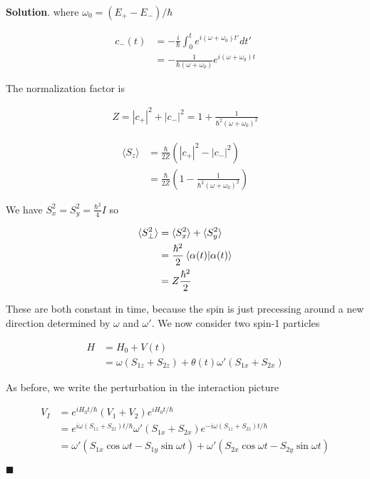 \documentclass[12pt]{article}
\theoremstyle{definition}
\newenvironment{s}{%
        \begin{trivlist} \item \textbf{Solution}. }{%
            \hspace*{\fill} $\blacksquare$\end{trivlist}}%
\begin{document}
{\begin{s}
where $\omega_{0} = (E_{+}-E_{-})/\hbar$

\begin{align*}
c_{-}(t) &= -\frac{i}{\hbar}\int_{0}^{t}e^{i(\omega+\omega_{0})t'}dt'\\
&= -\frac{1}{\hbar(\omega+\omega_{0})}e^{i(\omega+\omega_{0})t}
\end{align*}

The normalization factor is

\begin{align*}
Z = |c_{+}|^{2} + |c_{-}|^{2} = 1 + \frac{1}{\hbar^{2}(\omega+\omega_{0})^{2}}
\end{align*}

\begin{align*}
\langle S_{z}\rangle &= \frac{\hbar}{2Z}\left(|c_{+}|^{2} - |c_{-}|^{2}\right)\\
&= \frac{\hbar}{2Z}\left(1 - \frac{1}{\hbar^{2}(\omega+\omega_{0})^{2}}\right)
\end{align*}

We have $S_{x}^{2} = S_{y}^{2} = \frac{\hbar^{2}}{4}I$ so

\begin{align*}
\langle S_{\perp}^{2}\rangle &= \langle S_{x}^{2}\rangle + \langle S_{y}^{2}\rangle\\
&= \frac{\hbar^{2}}{2}\bra{\alpha (t)}\ket{\alpha(t)}\\
&= Z\frac{\hbar^{2}}{2}
\end{align*}

These are both constant in time, because the spin is just precessing around a new direction determined by $\omega$ and $\omega'$. We now consider two spin-1 particles

\begin{align*}
H &= H_{0} + V(t)\\
&= \omega \left(S_{1z}+S_{2z}\right) + \theta(t)\omega' \left(S_{1x}+S_{2x}\right)
\end{align*}

As before, we write the perturbation in the interaction picture

\begin{align*}
V_{I} &= e^{iH_{0}t/\hbar}(V_{1}+V_{2}) e^{iH_{0}t/\hbar}\\
&= e^{i\omega (S_{1z}+S_{2z})t/\hbar} \omega' \left(S_{1x}+S_{2x}\right) e^{-i\omega (S_{1z}+S_{2z})t/\hbar}\\
&= \omega'\left(S_{1x}\cos\omega t -S_{1y}\sin\omega t\right)+\omega'\left(S_{2x}\cos\omega t -S_{2y}\sin\omega t\right)
\end{align*}




\end{s}}
\end{document}
